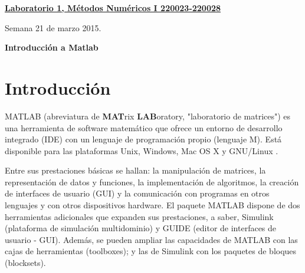 \documentclass[11pt]{article}
\begin{document}
\hspace*{-1,5cm}

\vspace*{0.5cm} \centerline {\bf\underline{Laboratorio 1, M\'etodos Num\'ericos I 220023-220028 }}
\centerline{\textrm{Semana 21 de marzo 2015.}}  \vspace{0.2cm}




\centerline{\textbf{Introducci\'on  a Matlab} \circledR} 
%
\section{Introducci\'on}

MATLAB (abreviatura de \textbf{MAT}rix \textbf{LAB}oratory, "laboratorio de matrices") es una herramienta de 
software matem\'atico que ofrece un entorno de desarrollo integrado (IDE) con un lenguaje de programación propio 
(lenguaje M). Está disponible para las plataformas Unix, Windows, Mac OS X y GNU/Linux .

Entre sus prestaciones básicas se hallan: la manipulación de matrices, la representación de datos y funciones, 
la implementación de algoritmos, la creación de interfaces de usuario (GUI) y la comunicación con programas en 
otros lenguajes y con otros dispositivos hardware. El paquete MATLAB dispone de dos herramientas adicionales 
que expanden sus prestaciones, a saber, Simulink (plataforma de simulación multidominio) y GUIDE 
(editor de interfaces de usuario - GUI). Además, se pueden ampliar las capacidades de MATLAB con las cajas 
de herramientas (toolboxes); y las de Simulink con los paquetes de bloques (blocksets).
%
\end{document}
